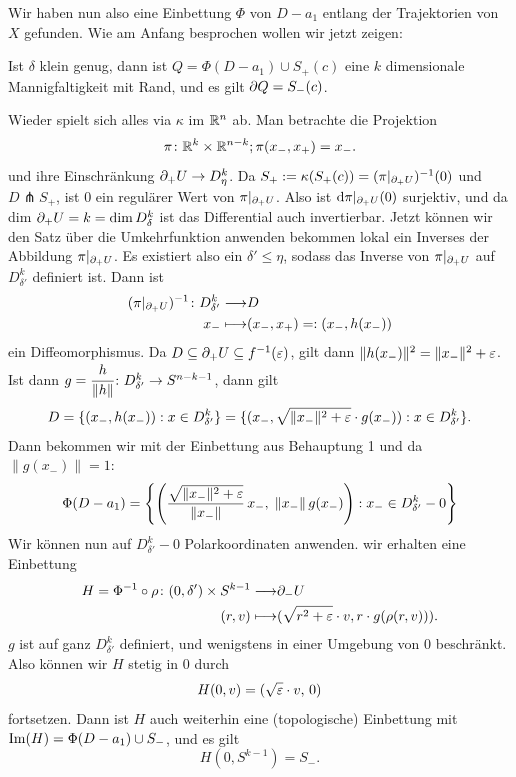 \begin{bigproof}
    Wir haben nun also eine Einbettung $\Phi$ von $D - a_1$ entlang der Trajektorien von $X$ gefunden.
    Wie am Anfang besprochen wollen wir jetzt zeigen:

    \begin{claim}
        Ist $\delta$ klein genug, dann ist $Q = \Phi (D - a_1) \cup S_+ (c)$ eine $k$ dimensionale 
        Mannigfaltigkeit mit Rand, und es gilt ${ \partial } Q = S_- (c)$.
    \end{claim}

    \begin{smallproof}
        Wieder spielt sich alles via $\kappa$ im ${ \mathbb R }^n$ ab.
        Man betrachte die Projektion
        \[ \pi \colon { \mathbb R }^k \times { \mathbb R }^{n - k} ; \pi (x_-, x_+) = x_- . \]
        und ihre Einschränkung ${ \partial }_+ U \to D_{\eta}^k$.
         Da $S_+ := \kappa(S_+(c)) = (\pi|_{{ \partial }_+U})^{-1}(0)$
        und $D \pitchfork S_+$, ist $0$ ein regulärer Wert von $\pi|_{{ \partial }_+U}$.
        Also ist ${ \operatorname{d} } \pi|_{{ \partial }_+U} (0)$ surjektiv, und da dim ${ \partial }_+U = k = \dim D^k_{\delta}$ ist
        das Differential auch invertierbar. Jetzt können wir den Satz über die Umkehrfunktion anwenden 
        bekommen lokal ein Inverses der Abbildung $\pi|_{{ \partial }_+U}$. Es existiert also ein 
        $\delta' \leq \eta$, sodass das Inverse von $\pi|_{{ \partial }_+U}$ auf $D^k_{\delta'}$ definiert 
        ist. Dann ist 
        \begin{align*}
            (\pi|_{{ \partial }_+U})^{-1} \colon D^k_{\delta'} \longrightarrow & D \\
            x_- \longmapsto & (x_-, x_+) =: (x_-, h(x_-))
        \end{align*}
        ein Diffeomorphismus. Da $D \subseteq { \partial }_+U \subseteq f^{-1}(\varepsilon)$, gilt dann 
        $\| h(x_-) \|^2 = \| x_- \|^2 + \varepsilon $. Ist dann 
        $g = \cfrac{h}{\| h \|} \colon D^k_{\delta'} \to S^{n - k - 1}$, dann gilt
        \[ D = \{ (x_-, h(x_-)): x \in D^k_{\delta'} \} 
            = \{ (x_-, \sqrt{\| x_- \|^2 + \varepsilon} \cdot g(x_-)): x \in D^k_{\delta'} \} . \]
        Dann bekommen wir mit der Einbettung aus Behauptung 1 und da $\| g(x_-) \| = 1$:
        \[ \Phi(D - a_1) = 
            \left\{ \left( \frac{\sqrt{\| x_- \|^2 + \varepsilon}}{\| x_- \|} \, x_-, \; 
                    \| x_- \| \, g(x_-) \right) : 
                x_- \in D^k_{\delta'} - 0 \right\} \]
        Wir können nun auf $D^k_{\delta'} - 0$ Polarkoordinaten anwenden. wir erhalten eine 
        Einbettung
        \begin{align*}
            H = \Phi^{-1} \circ \rho \colon (0, \delta') \times S^{k-1} \longrightarrow & { \partial }_- U \\
            (r, v) \longmapsto & ( \sqrt{r^2 + \varepsilon} \cdot v, r \cdot g(\rho(r, v))) .
        \end{align*}
        $g$ ist auf ganz $D^k_{\delta'}$ definiert, und wenigstens in einer Umgebung von $0$ 
        beschränkt. Also können wir $H$ stetig in $0$ durch
        \[ H(0, v) = (\sqrt{\varepsilon} \cdot v, \, 0) \]
        fortsetzen. Dann ist $H$ auch weiterhin eine (topologische) Einbettung mit 
        ${ \operatorname{Im} } (H) = \Phi(D - a_1) \cup S_- $, und es gilt 
        \[ H(0, S^{k - 1}) = S_- . \]
    \end{smallproof}


\end{bigproof}
